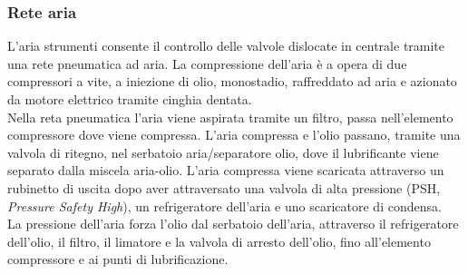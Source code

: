 \subsubsection*{Rete aria}
L'aria strumenti consente il controllo delle valvole dislocate in centrale tramite una rete pneumatica ad aria. La compressione dell'aria è a opera di due compressori a vite, a iniezione di olio, monostadio, raffreddato ad aria e azionato da motore elettrico tramite cinghia dentata.\\
Nella reta pneumatica l'aria viene aspirata tramite un filtro, passa nell'elemento compressore dove viene compressa. L'aria compressa e l'olio passano, tramite una valvola di ritegno, nel serbatoio aria/separatore olio, dove il lubrificante viene separato dalla miscela aria-olio. L'aria compressa viene scaricata attraverso un rubinetto di uscita dopo aver attraversato una valvola di alta pressione (PSH, \textit{Pressure Safety High}), un refrigeratore dell'aria e uno scaricatore di condensa.\\
La pressione dell'aria forza l'olio dal serbatoio dell'aria, attraverso il refrigeratore dell'olio, il filtro, il limatore e la valvola di arresto dell'olio, fino all'elemento compressore e ai punti di lubrificazione.

